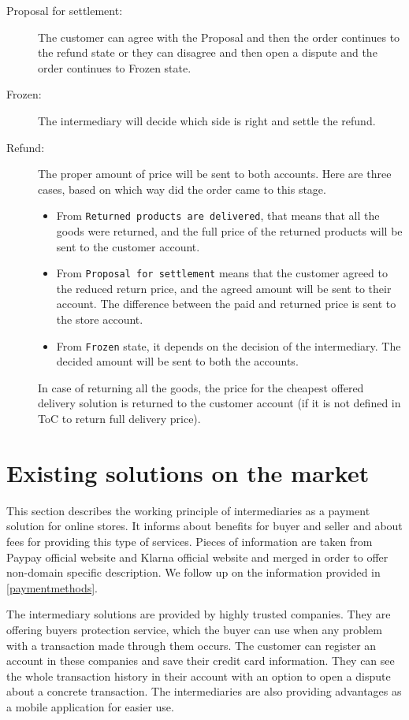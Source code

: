 \documentclass[thesis=M,english]{FITthesis}[2019/12/23]
\begin{document}
\begin{description}
\item[Proposal for settlement:]
The customer can agree with the Proposal and then the order continues to the refund state or they can disagree and then open a dispute and the order continues to Frozen state. 

\item[Frozen:]
The intermediary will decide which side is right and settle the refund.

\item[Refund:]
The proper amount of price will be sent to both accounts. Here are three cases, based on which way did the order came to this stage.
\begin{itemize}

\item From \texttt{Returned products are delivered}, that means that all the goods were returned, and the full price of the returned products will be sent to the customer account.
\item From \texttt{Proposal for settlement} means that the customer agreed to the reduced return price, and the agreed amount will be sent to their account. The difference between the paid and returned price is sent to the store account.
\item From \texttt{Frozen} state, it depends on the decision of the intermediary. The decided amount will be sent to both the accounts.
\end{itemize}
In case of returning all the goods, the price for the cheapest offered delivery solution is returned to the customer account (if it is not defined in ToC  to return full delivery price).
\end{description}




\label{existingSolutions}
\section{Existing solutions on the market}


This section describes the working principle of intermediaries as a payment solution for online stores. It informs about benefits for buyer and seller and about fees for providing this type of services. Pieces of information are taken from Paypay official website and Klarna official website and merged in order to offer non-domain specific description. We follow up on the information provided in \ref{paymentmethods}.

The intermediary solutions are provided by highly trusted companies. They are offering buyers protection service, which the buyer can use when any problem with a transaction made through them occurs. The customer can register an account in these companies and save their credit card information. They can see the whole transaction history in their account with an option to open a dispute about a concrete transaction. The intermediaries are also providing advantages as a mobile application for easier use.
\end{document}
